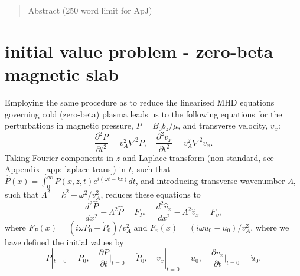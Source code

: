 \documentclass{aastex61}
\begin{document}

\author[0000-0002-0771-743X]{Matthew Allcock}

\author[0000-0003-3439-4127]{Robert Erd\'{e}lyi}


\begin{abstract}

Abstract (250 word limit for ApJ)

\end{abstract}


\section{initial value problem - zero-beta magnetic slab}

Employing the same procedure as \cite{rud_etal06} to reduce the linearised MHD equations governing cold (zero-beta) plasma leads us to the following equations for the perturbations in magnetic pressure, $P = B_0b_z/\mu$, and transverse velocity, $v_x$:
\begin{equation}
\frac{\partial^2P}{\partial{}t^2} = v_A^2 \nabla^2P, \quad \frac{\partial^2v_x}{\partial{}t^2} = v_A^2 \nabla^2v_x.
\end{equation}
Taking Fourier components in $z$ and Laplace transform (non-standard, see Appendix~\ref{app: laplace trans}) in $t$, such that $\hat{P}(x) = \int_0^\infty P(x,z,t)e^{i(\omega{}t-kz)} dt$, and introducing transverse wavenumber $\Lambda$, such that $\Lambda^2 = k^2 - \omega^2 / v_A^2$, reduces these equations to
\begin{equation}
\frac{d^2\hat{P}}{dx^2} - \Lambda^2 \hat{P} = F_P, \quad \frac{d^2\hat{v}_x}{dx^2} - \Lambda^2 \hat{v}_x = F_v,
\end{equation}
where $F_P(x) = (i\omega P_0 - \dot{P}_0) / v_A^2$ and $F_v(x) = (i\omega u_0 - \dot{u}_0) / v_A^2$, where we have defined the initial values by
\begin{equation}
P|_{t=0} = P_0, \quad \frac{\partial{}P}{\partial{t}}\biggr\rvert_{t=0} = \dot{P}_0, \quad v_x|_{t=0} = u_0, \quad \frac{\partial{}v_x}{\partial{t}}\biggr\rvert_{t=0} = \dot{u}_0.
\end{equation}
\end{document}
